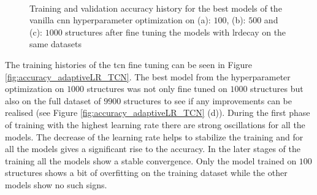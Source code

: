 \documentclass[conference]{IEEEtran}
\begin{document}
\begin{figure}[htp]
	\centering
	\quad
	\\
	\caption{Training and validation accuracy history for the best models of the vanilla \gls{cnn} hyperparameter optimization on (a): $ 100 $, (b): $ 500 $ and (c): $ 1000 $ structures after fine tuning the models with \gls{lrdecay} on the same datasets}
	\label{fig:accuracy_adaptiveLR_CNN}
\end{figure}

 The training histories of the \gls{tcn} fine tuning can be seen in Figure \ref{fig:accuracy_adaptiveLR_TCN}. The best model from the hyperparameter optimization on $ 1000 $ structures was not only fine tuned on $ 1000 $ structures but also on the full dataset of $ 9900 $ structures to see if any improvements can be realised (see Figure \ref{fig:accuracy_adaptiveLR_TCN} (d)). During the first phase of training with the highest learning rate there are strong oscillations for all the models. The decrease of the learning rate helps to stabilize the training and for all the models gives a significant rise to the accuracy. In the later stages of the training all the models show a stable convergence. Only the model trained on $ 100 $ structures shows a bit of overfitting on the training dataset while the other models show no such signs. 
\end{document}
